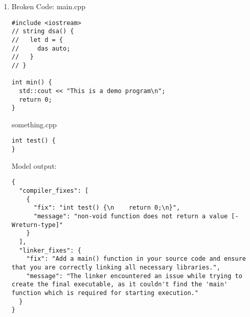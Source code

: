 \documentclass{article}
\begin{document}
\begin{enumerate}
\begin{verbatim}
  struct Monkey m = {
    .furee = 3
  };
}
			\end{verbatim}
			Model output:
			\begin{verbatim}
{
  "fixes": [
    {
      "fix": "int main() {\n struct Monkey {\n int fury;\n };\n}",
      "message": "The variable name 'furee' should be corrected to 'fury'. This is because in C programming, the identifier 'furee' does not exist and therefore causes an error. To fix this issue, change the variable name from 'furee' to 'fury', which will make it a valid field in the struct Monkey."
    }
  ]
}		\end{verbatim}
			The issue with the code is most likely a misspelling, however the model takes the safe call and removed the invalid struct allocation. \\
			The fixed code from the model is:
			\begin{verbatim}

int main() {
  struct Monkey {
    int fury;
  };
}
			\end{verbatim}

			\item
			Broken Code:
			main.cpp
			\begin{verbatim}
#include <iostream>
// string dsa() {
//   let d = {
//     das auto;
//   }
// }

int min() {
  std::cout << "This is a demo program\n";
  return 0;
}
			\end{verbatim}
			something.cpp
			\begin{verbatim}
int test() {
}
			\end{verbatim}
			Model output:
			\begin{verbatim}
{
  "compiler_fixes": [
    {
      "fix": "int test() {\n    return 0;\n}",
      "message": "non-void function does not return a value [-Wreturn-type]"
    }
  ],
  "linker_fixes": {
    "fix": "Add a main() function in your source code and ensure that you are correctly linking all necessary libraries.",
    "message": "The linker encountered an issue while trying to create the final executable, as it couldn't find the 'main' function which is required for starting execution."
  }
}
			\end{verbatim}
		\end{enumerate}
\end{document}
